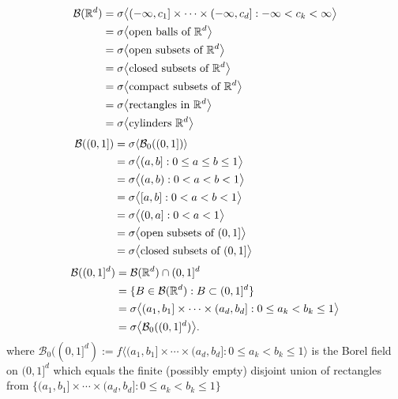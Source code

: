 \begin{theorem}\label{eqvgens}
\begin{align*}
\mathcal B(\Bbb R^d)
& = \sigma\bigl\langle (-\infty,c_1]\times \cdots \times (-\infty, c_d]: -\infty < c_k< \infty \bigr\rangle    \\
& = \sigma\bigl\langle \text{open balls of $\Bbb R^d$}  \bigr\rangle  \\
& = \sigma\bigl\langle \text{open subsets of $\Bbb R^d$}  \bigr\rangle  \\
& = \sigma\bigl\langle \text{closed subsets of $\Bbb R^d$}  \bigr\rangle\\
& = \sigma\bigl\langle \text{compact subsets of $\Bbb R^d$}  \bigr\rangle \\
& = \sigma\bigl\langle \text{rectangles in $\Bbb R^d$}  \bigr\rangle \\
& = \sigma\bigl\langle \text{cylinders $\Bbb R^d$}  \bigr\rangle
\end{align*}
\begin{align*}
\mathcal B((0,1])
&=\sigma\langle \mathcal B_0((0,1])\rangle \hphantom{asdfdddddddasdfasdfasdfasdf}\\
&= \sigma\bigl\langle (a,b]: 0\leq a \leq b \leq 1 \bigr\rangle \\
  & =\sigma\bigl\langle (a,b): 0< a < b <1  \bigr\rangle \\
  & =\sigma\bigl\langle [a,b]: 0< a < b <1  \bigr\rangle \\
    & =\sigma\bigl\langle (0,a]: 0< a  <1  \bigr\rangle \\
& = \sigma\bigl\langle \text{open subsets of $(0,1]$}  \bigr\rangle  \\
& = \sigma\bigl\langle \text{closed subsets of $(0,1]$}  \bigr\rangle
\end{align*}
\begin{align*}
\mathcal B((0,1]^d)
& = \mathcal B(\Bbb R^d)\cap (0,1]^d \\
& = \{B\in\mathcal B(\Bbb R^d): B\subset (0,1]^d  \} \\
&=  \sigma\bigl \langle (a_1,b_1]\times\cdots\times (a_d,b_d] : 0\leq a_k<b_k\leq 1 \bigr\rangle \\
& = \sigma\bigl\langle  \mathcal B_0((0,1]^d)  \bigr\rangle.
\end{align*}
where $\mathcal B_0((0,1]^d):= f\bigl \langle (a_1,b_1]\times\cdots\times (a_d,b_d] : 0\leq a_k< b_k\leq 1 \bigr\rangle$ is the Borel field on $(0,1]^d$ which equals the finite (possibly empty) disjoint union of rectangles from $\{(a_1,b_1]\times\cdots\times (a_d,b_d] : 0\leq a_k< b_k\leq1  \}$

\end{theorem}

